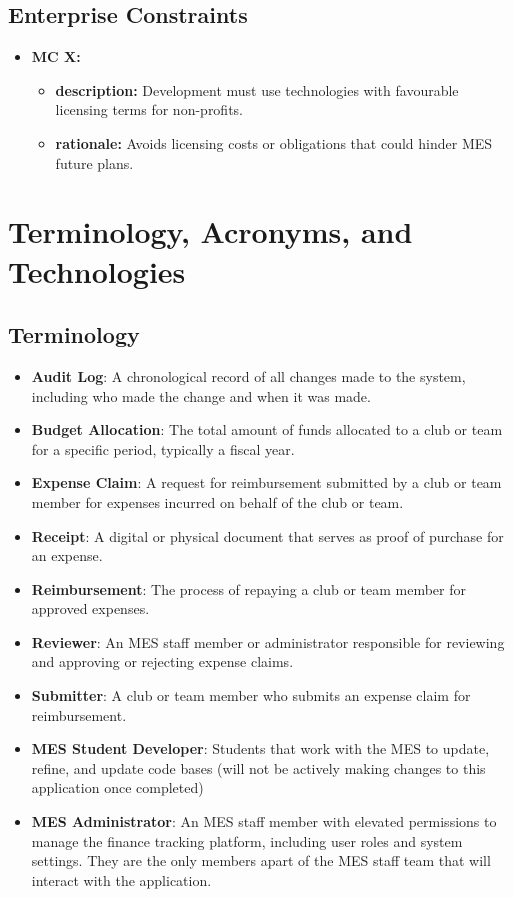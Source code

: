 \documentclass[12pt]{article}
\begin{document}
\subsection{Enterprise Constraints}
  \begin{itemize}
    \item \textbf{MC X:}
      \begin{itemize}[label=$\circ$]
        \item \textbf{description:} Development must use technologies with favourable licensing terms for non-profits.
        \item \textbf{rationale:} Avoids licensing costs or obligations that could hinder MES future plans.
      \end{itemize}
  \end{itemize}


\section{Terminology, Acronyms, and Technologies}

  \subsection{Terminology}
    \begin{itemize}
      \item \textbf{Audit Log}: A chronological record of all changes made to the system, including who made the change and when it was made.
      \item \textbf{Budget Allocation}: The total amount of funds allocated to a club or team for a specific period, typically a fiscal year.
      \item \textbf{Expense Claim}: A request for reimbursement submitted by a club or team member for expenses incurred on behalf of the club or team.
      \item \textbf{Receipt}: A digital or physical document that serves as proof of purchase for an expense.
      \item \textbf{Reimbursement}: The process of repaying a club or team member for approved expenses.
      \item \textbf{Reviewer}: An MES staff member or administrator responsible for reviewing and approving or rejecting expense claims.
      \item \textbf{Submitter}: A club or team member who submits an expense claim for reimbursement.
      \item \textbf{MES Student Developer}: Students that work with the MES to update, refine, and update code bases (will not be actively making changes to this application once completed)
      \item \textbf{MES Administrator}: An MES staff member with elevated permissions to manage the finance tracking platform, including user roles and system settings. They are the only members apart of the MES staff team that will interact with the application.
    \end{itemize}
\end{document}
